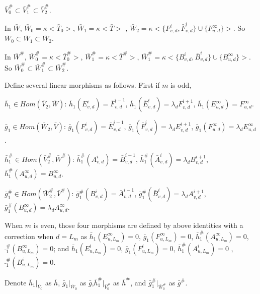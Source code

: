 \def\CTEXPreproc{Created by ctex v0.2.12, don't edit!}\documentclass[11pt]{article}
\begin{document}
\begin{pf}
     \noindent $\bar{V}^{\#}_0 \subset \bar{V}^{\#}_1 \subset \bar{V}^{\#}_2$.

      \noindent  In $ \bar{W}$, $\bar{W}_0 =\kappa < \bar{T}_0 >$,  $\bar{W}_1 =\kappa < \bar{T}>$ ,
          $\bar{W}_2 =\kappa <\{ F^{i}_{v,d} , \bar{F}^{i}_{v,d}\} \cup \{ F^{\infty}_{u,d} \} >$.  So $\bar{W}_0 \subset \bar{W}_1 \subset \bar{W}_2$.


      \noindent  In $\bar{W}^{\#} $,   $\bar{W}^{\#}_0 =\kappa <\bar{T}^{\#}_0  > $,  $\bar{W}^{\#}_1 =\kappa <\bar{T}^{\#} >$,
         $\bar{W}^{\#}_1 =\kappa < \{ B^{i}_{v,d} , \bar{B}^{i}_{v,d}\} \cup \{ B^{\infty}_{u,d} \} >$. So $\bar{W}^{\#}_0 \subset \bar{W}^{\#}_1 \subset \bar{W}^{\#}_2$.

         Define several linear morphisms as follows. First if $m$ is odd,

       \noindent $\bar{h}_1 \in Hom( \bar{V}_2 , \bar{W} )$:  $\bar{h}_1 ( E^i _{v,d}  )= \bar{F}^{i-1}_{v,d}$,
        $\bar{h}_1 ( \bar{E}^i _{v,d} )= \lambda_d F^{i+1}_{v,d}$, $\bar{h}_1 ( E^{\infty}_{u,d}  )= F^{\infty}_{u,d} $.


        \noindent $\bar{g}_1 \in Hom (\bar{W}_2 , \bar{V}) $: $\bar{g}_1 ( F^i _{v,d}  )= \bar{E}^{i-1}_{v,d}$,
        $\bar{g}_1 ( \bar{F}^i _{v,d} )= \lambda_d E^{i+1}_{v,d}$, $\bar{g}_1 ( F^{\infty}_{u,d}  )= \lambda_d E^{\infty}_{u,d} $.


        \noindent $\bar{h}^{\#}_1 \in Hom( \bar{V}^{\#}_2 , \bar{W}^{\#} )$: $\bar{h}^{\#}_1 ( A^i _{v,d}  )= \bar{B}^{i-1}_{v,d}$,
        $\bar{h}^{\#}_1 ( \bar{A}^i _{v,d} )= \lambda_d B^{i+1}_{v,d}$, $\bar{h}^{\#}_1 ( A^{\infty}_{u,d}  )= B^{\infty}_{u,d} $.


        \noindent $\bar{g}^{\#}_1 \in Hom(\bar{W}^{\#}_2 , \bar{V}^{\#})$:  $\bar{g}^{\#}_1 ( B^i _{v,d}  )= \bar{A}^{i-1}_{v,d}$,
        $\bar{g}^{\#}_1 ( \bar{B}^i _{v,d} )= \lambda_d A^{i+1}_{v,d}$, $\bar{g}^{\#}_1 ( B^{\infty}_{u,d}  )= \lambda_d A^{\infty}_{u,d} $.

        When $m$ is even, those four morphisms are defined by above identities with a correction when $d=L_m$ as
        $\bar{h}_1 ( E^{\infty}_{u, L_m } )=0 $,  $\bar{g}_1 ( F^{\infty}_{u, L_m } )=0    $,  $\bar{h}^{\#}_1 ( A^{\infty}_{u, L_m } )=0    $, $\bar{}^{\#}_1 ( B^{\infty}_{u, L_m } )=0  $; and
         $\bar{h}_1 ( E^{i}_{u, L_m } )=0 $,  $\bar{g}_1 ( F^{i}_{u, L_m } )=0    $,  $\bar{h}^{\#}_1 ( A^{i}_{u, L_m } )=0    $ , $\bar{}^{\#}_1 ( B^{i}_{u, L_m } )=0  $.


        Denote  $\bar{h}_1 |_{\bar{V}_0 }$ as $\bar{h}$,  $\bar{g}_1 |_{\bar{W}_0 }$ as $\bar{g}$,$\bar{h}^{\#}_1 |_{\bar{V}^{\#}_0 }$ as $\bar{h}^{\#}$,  and  $\bar{g}^{\#}_1 |_{\bar{W}^{\#}_0 }$ as $\bar{g}^{\#}$.





\end{pf}
\end{document}
